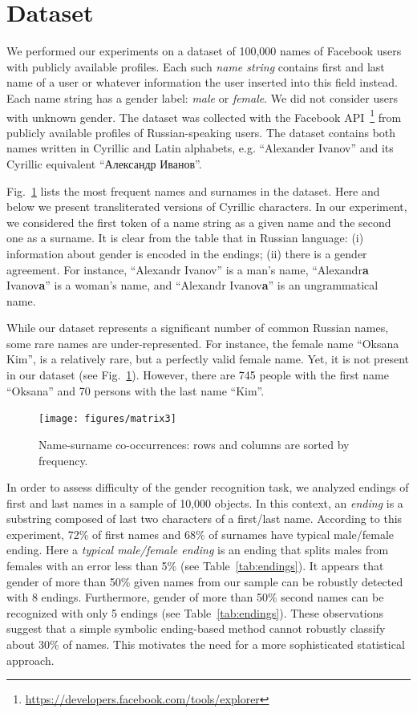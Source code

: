 \documentclass[runningheads,a4paper]{llncs}
\newcommand\textcyr[1]{{\fontencoding{OT2}\fontfamily{wncyr}\selectfont #1}}
\begin{document}
\section{Dataset}

We performed our experiments on a dataset of 100,000 names of Facebook users with publicly available profiles. Each such \textit{name string} contains first and last name of a user or whatever information the user inserted into this field instead. Each name string has a gender label: \textit{male} or \textit{female}. We did not consider users with unknown gender. The dataset was collected with the Facebook API~\footnote{\url{https://developers.facebook.com/tools/explorer}} from publicly available profiles of Russian-speaking users. The dataset contains both names written in Cyrillic and Latin alphabets, e.g. ``Alexander Ivanov'' and its Cyrillic equivalent \textcyr{``Александр Иванов''}. 

Fig.~\ref{fig:matrix} lists the most frequent names and surnames in the dataset. Here and below we present transliterated versions of Cyrillic characters. In our experiment, we considered the first token of a name string as a given name and the second one as a surname. It is clear from the table that in Russian language: (i) information about gender is encoded in the endings; (ii) there is a gender agreement. For instance, ``Alexandr Ivanov'' is a man's name, ``Alexandr\textbf{a} Ivanov\textbf{a}'' is a woman's name, and ``Alexandr Ivanov\textbf{a}'' is an ungrammatical name.   

While our dataset represents a significant number of common Russian names, some rare names are under-represented. For instance, the female name ``Oksana Kim'', is a relatively rare, but a perfectly valid female name. Yet, it is not present in our dataset (see Fig.~\ref{fig:matrix}). However, there are 745 people with the first name ``Oksana'' and 70 persons with the last name ``Kim''.  


\begin{figure}
\centering
\texttt{[image: figures/matrix3]} 
\caption{ Name-surname co-occurrences: rows and columns are sorted by frequency. }
\label{fig:matrix}
\end{figure}

In order to assess difficulty of the gender recognition task, we analyzed endings of first and last names in a sample of 10,000 objects. In this context, an \textit{ending} is a substring composed of last two characters of a first/last name. According to this experiment, 72\% of first names and 68\% of surnames have typical male/female ending. Here a \textit{typical male/female ending} is an ending that splits males from females with an error less than 5\% (see Table~\ref{tab:endings}). It appears that gender of more than 50\% given names from our sample can be robustly detected with 8 endings. Furthermore, gender of more than 50\% second names can be recognized with only 5 endings (see Table~\ref{tab:endings}). These observations suggest that a simple symbolic ending-based method cannot robustly classify about 30\% of names. This motivates the need for a more sophisticated statistical approach. 
\end{document}
